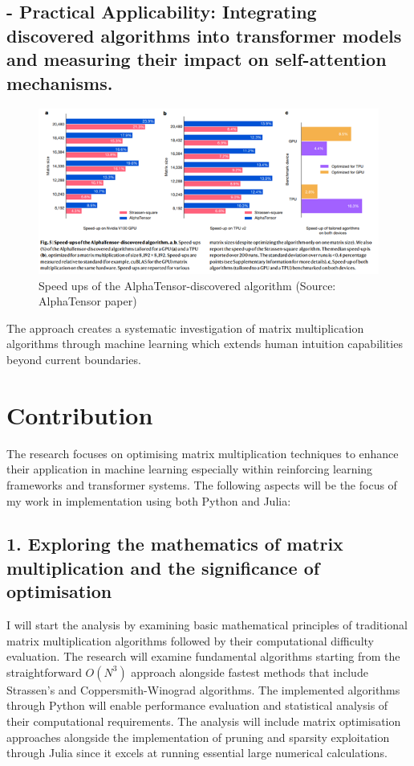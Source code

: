 \documentclass{article}
\begin{document}
\subsection{- Practical Applicability: Integrating discovered algorithms into transformer models and measuring their impact on self-attention mechanisms.} 
\begin{figure}[H]
    \centering
    \includegraphics[width=0.6\linewidth]{Picture3.png}
    \caption{Speed ups of the AlphaTensor-discovered algorithm (Source: AlphaTensor paper)}
    \label{fig:speedups-alphatensor}
\end{figure}

The approach creates a systematic investigation of matrix multiplication algorithms through machine learning which extends human intuition capabilities beyond current boundaries.

\section{Contribution}
The research focuses on optimising matrix multiplication techniques to enhance their application in machine learning especially within reinforcing learning frameworks and transformer systems. The following aspects will be the focus of my work in implementation using both Python and Julia:

\subsection*{1. Exploring the mathematics of matrix multiplication and the significance of optimisation}
I will start the analysis by examining basic mathematical principles of traditional matrix multiplication algorithms followed by their computational difficulty evaluation. The research will examine fundamental algorithms starting from the straightforward \( O(N^3) \) approach alongside fastest methods that include Strassen's and Coppersmith-Winograd algorithms. The implemented algorithms through Python will enable performance evaluation and statistical analysis of their computational requirements. The analysis will include matrix optimisation approaches alongside the implementation of pruning and sparsity exploitation through Julia since it excels at running essential large numerical calculations.
\end{document}
